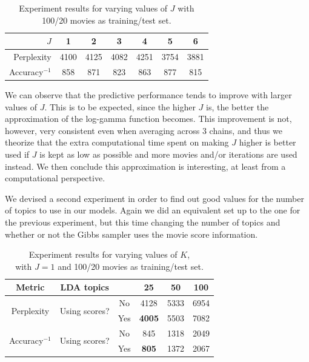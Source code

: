 \documentclass{article} %
\begin{document}
\begin{table}[ht!]
\caption{Experiment results for varying values of $J$ with 100/20 movies as training/test set.}
\label{table:J}
\begin{center}
\begin{tabular}{r|cccccc}
\(J\)               & 1 & 2 & 3 & 4 & 5 & 6 \\ \hline
Perplexity      & 4100 & 4125 & 4082 & 4251 & 3754 & 3881 \\
Accuracy$^{-1}$ & 858 & 871 & 823 & 863 & 877 & 815 \\
\end{tabular}
\end{center}
\end{table}

We can observe that the predictive performance tends to improve with larger values of $J$. 
This is to be expected, since the higher $J$ is, the better the approximation of the log-gamma function becomes.
This improvement is not, however, very consistent even when averaging across 3 chains, and thus we theorize that the extra computational time spent on making $J$ higher is better used if $J$ is kept as low as possible and more movies and/or iterations are used instead.
We then conclude this approximation is interesting, at least from a computational perspective.

We devised a second experiment in order to find out good values for the number of topics to use in our models.
Again we did an equivalent set up to the one for the previous experiment, but this time changing the number of topics and whether or not the Gibbs sampler uses the movie score information.

\begin{table}[ht!]
\captionsetup{justification=centering}
\caption{Experiment results for varying values of $K$,\\ with $J=1$ and 100/20 movies as training/test set.} 
\label{tab:K}
\begin{center}
\begin{tabular}{c|cc|ccc}

Metric &	LDA topics      & & 25 & 50 & 100 \\ \hline
\multirow{2}{*}{Perplexity} &	\multirow{2}{*}{Using scores?} & No  & 4128 & 5333 & 6954 \\
			  &             & Yes & \textbf{4005} & 5503 & 7082 \\ \hline
\multirow{2}{*}{Accuracy$^{-1}$} & \multirow{2}{*}{Using scores?} & No  & 845 & 1318 & 2049 \\
			      &          & Yes & \textbf{805} & 1372 & 2067 \\
\end{tabular}
\end{center}
\end{table}
\end{document}
